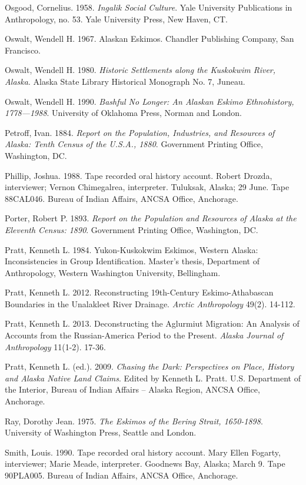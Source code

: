 \begin{hang}
Osgood, Cornelius. 1958.	\textit{Ingalik Social Culture}. Yale University Publications in Anthropology, no. 53. Yale University Press, New Haven, CT.

Oswalt, Wendell H. 1967. Alaskan Eskimos. Chandler Publishing Company, San Francisco.

Oswalt, Wendell H. 1980. \textit{Historic Settlements along the Kuskokwim River, Alaska}. Alaska State Library Historical Monograph No. 7, Juneau.

Oswalt, Wendell H. 1990. \textit{Bashful No Longer: An Alaskan Eskimo Ethnohistory, 1778—1988}. University of Oklahoma Press, Norman and London.

Petroff, Ivan. 1884. \textit{Report on the Population, Industries, and Resources of Alaska: Tenth Census of the U.S.A., 1880}. Government Printing Office, Washington, DC.

Phillip, Joshua. 1988. Tape recorded oral history account. Robert Drozda, interviewer; Vernon Chimegalrea, interpreter. Tuluksak, Alaska; 29 June. Tape 88CAL046. Bureau of Indian Affairs, ANCSA Office, Anchorage.

Porter, Robert P. 1893. \textit{Report on the Population and Resources of Alaska at the Eleventh Census: 1890}. Government Printing Office, Washington, DC.

Pratt, Kenneth L. 1984. Yukon-Kuskokwim Eskimos, Western Alaska: Inconsistencies in Group Identification.  Master’s thesis, Department of Anthropology, Western Washington University, Bellingham.

Pratt, Kenneth L. 2012. Reconstructing 19th-Century Eskimo-Athabascan Boundaries in the Unalakleet River Drainage. \textit{Arctic Anthropology} 49(2). 14-112.

Pratt, Kenneth L. 2013. Deconstructing the Aglurmiut Migration: An Analysis of Accounts from the Russian-America Period to the Present. \textit{Alaska Journal of Anthropology} 11(1-2). 17-36.

Pratt, Kenneth L. (ed.). 2009. \textit{Chasing the Dark: Perspectives on Place, History and Alaska Native Land Claims}. Edited by Kenneth L. Pratt. U.S. Department of the Interior, Bureau of Indian Affairs – Alaska Region, ANCSA Office, Anchorage.

Ray, Dorothy Jean. 1975. \textit{The Eskimos of the Bering Strait, 1650-1898}. University of Washington Press, Seattle and London.

Smith, Louis. 1990. Tape recorded oral history account. Mary Ellen Fogarty, interviewer; Marie Meade, interpreter. Goodnews Bay, Alaska; March 9. Tape 90PLA005. Bureau of Indian Affairs, ANCSA Office, Anchorage.


\end{hang}
